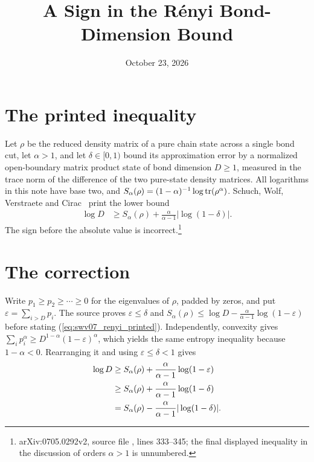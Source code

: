 \documentclass{article}
\title{A Sign in the R\'enyi Bond-Dimension Bound}
\author{}
\date{October 23, 2026}
\begin{document}
\maketitle
{}

\section{The printed inequality}

Let $\rho$ be the reduced density matrix of a pure chain state across a single bond cut,
let $\alpha>1$, and let $\delta\in[0,1)$ bound its approximation error by a
normalized open-boundary matrix product state of bond dimension $D\ge1$,
measured in the
trace norm of the difference of the two pure-state density matrices.
All logarithms in this note have base two, and
$S_\alpha(\rho)=(1-\alpha)^{-1}\log\operatorname{tr}(\rho^\alpha)$.
Schuch, Wolf, Verstraete and Cirac~\cite{Schuch2008EntropyScaling}
print the lower bound
\begin{align}
    \log D &\ge S_\alpha(\rho)
      +\frac{\alpha}{\alpha-1}|\log(1-\delta)|.
    \label{eq:swv07_renyi_printed}
\end{align}
The sign before the absolute value is incorrect.\footnote{arXiv:0705.0292v2,
    source file , lines 333--345; the final displayed
    inequality in the discussion of orders $\alpha>1$ is unnumbered.}

\section{The correction}

Write $p_1\ge p_2\ge\cdots\ge0$ for the eigenvalues of $\rho$, padded by
zeros, and put $\varepsilon=\sum_{i>D}p_i$. The source proves
$\varepsilon\le\delta$ and
$S_\alpha(\rho)\le\log D-\frac{\alpha}{\alpha-1}\log(1-\varepsilon)$
before stating (\ref{eq:swv07_renyi_printed}). Independently, convexity gives
$\sum_i p_i^\alpha\ge D^{1-\alpha}(1-\varepsilon)^\alpha$, which yields
the same entropy inequality because $1-\alpha<0$. Rearranging it and using
$\varepsilon\le\delta<1$ gives
\begin{align}
    \log D
      &\ge S_\alpha(\rho)+\frac{\alpha}{\alpha-1}\log(1-\varepsilon)
        \notag\\
      &\ge S_\alpha(\rho)+\frac{\alpha}{\alpha-1}\log(1-\delta)
        \notag\\
      &= S_\alpha(\rho)-\frac{\alpha}{\alpha-1}|\log(1-\delta)|.
    \label{eq:swv07_renyi_corrected}
\end{align}
\end{document}
